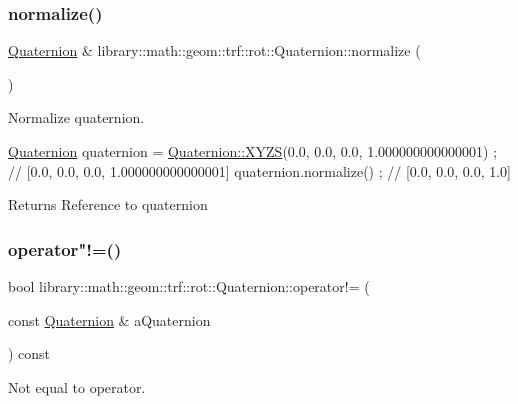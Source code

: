 \subsubsection{\texorpdfstring{normalize()}{normalize()}}
{\footnotesize\ttfamily \hyperlink{classlibrary_1_1math_1_1geom_1_1trf_1_1rot_1_1_quaternion}{Quaternion} \& library\+::math\+::geom\+::trf\+::rot\+::\+Quaternion\+::normalize (\begin{DoxyParamCaption}{ }\end{DoxyParamCaption})}



Normalize quaternion. 


\begin{DoxyCode}
\hyperlink{classlibrary_1_1math_1_1geom_1_1trf_1_1rot_1_1_quaternion_aa7f459a08f5af38b9f7676a6bf36a21c}{Quaternion} quaternion = \hyperlink{classlibrary_1_1math_1_1geom_1_1trf_1_1rot_1_1_quaternion_afff9523c7dcbfbbc521736121e62ad41}{Quaternion::XYZS}(0.0, 0.0, 0.0, 1.000000000000001) ; \textcolor{comment}{//
       [0.0, 0.0, 0.0, 1.000000000000001]}
quaternion.normalize() ; \textcolor{comment}{// [0.0, 0.0, 0.0, 1.0]}
\end{DoxyCode}


\begin{DoxyReturn}{Returns}
Reference to quaternion 
\end{DoxyReturn}
\mbox{\label{classlibrary_1_1math_1_1geom_1_1trf_1_1rot_1_1_quaternion_ad32520a30642548650622e22c6686e64}} 
\subsubsection{\texorpdfstring{operator"!=()}{operator!=()}}
{\footnotesize\ttfamily bool library\+::math\+::geom\+::trf\+::rot\+::\+Quaternion\+::operator!= (\begin{DoxyParamCaption}\item[{const \hyperlink{classlibrary_1_1math_1_1geom_1_1trf_1_1rot_1_1_quaternion}{Quaternion} \&}]{a\+Quaternion }\end{DoxyParamCaption}) const}



Not equal to operator. 


